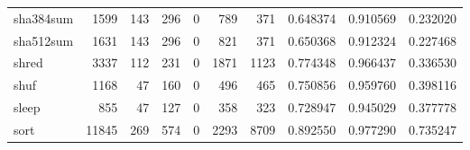 \begin{tabular}{lrrrrrrrrr}
sha384sum &                                1599 &                                             143 &                                            296 &                                             0 &                                            789 &                                          371 &                                           0.648374 &                               0.910569 &                             0.232020 \\
sha512sum &                                1631 &                                             143 &                                            296 &                                             0 &                                            821 &                                          371 &                                           0.650368 &                               0.912324 &                             0.227468 \\
shred     &                                3337 &                                             112 &                                            231 &                                             0 &                                           1871 &                                         1123 &                                           0.774348 &                               0.966437 &                             0.336530 \\
shuf      &                                1168 &                                              47 &                                            160 &                                             0 &                                            496 &                                          465 &                                           0.750856 &                               0.959760 &                             0.398116 \\
sleep     &                                 855 &                                              47 &                                            127 &                                             0 &                                            358 &                                          323 &                                           0.728947 &                               0.945029 &                             0.377778 \\
sort      &                               11845 &                                             269 &                                            574 &                                             0 &                                           2293 &                                         8709 &                                           0.892550 &                               0.977290 &                             0.735247 \\

\end{tabular}
